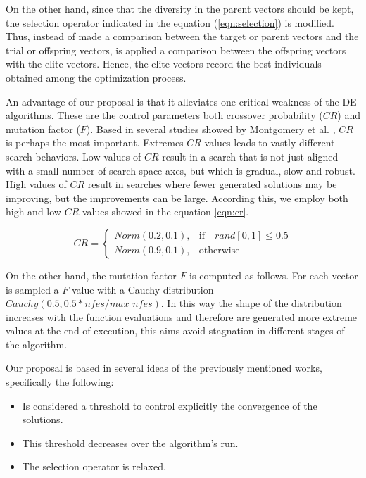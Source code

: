 On the other hand, since that the diversity in the parent vectors should be kept, the selection operator indicated in the equation (\ref{eqn:selection}) is modified.
%
Thus, instead of made a comparison between the target or parent vectors and the trial or offspring vectors, is applied a comparison between the offspring vectors with the elite vectors.
%
Hence, the elite vectors record the best individuals obtained among the optimization process.
%



An advantage of our proposal is that it alleviates one critical weakness of the DE algorithms.
%
These are the control parameters both crossover probability ($CR$) and mutation factor ($F$).
%
Based in several studies showed by Montgomery et al. \cite{montgomery2010analysis}, $CR$ is perhaps the most important.
%
Extremes $CR$ values leads to vastly different search behaviors.
%
Low values of $CR$ result in a search that is not just aligned with a small number of search space axes, but which is gradual, slow and robust.
%
High values of $CR$ result in searches where fewer generated solutions may be improving, but the improvements can be large.
%
According this, we employ both high and low $CR$ values showed in the equation \ref{eqn:cr}.

\begin{equation} \label{eqn:cr}
CR = 
\begin{cases}
     Norm(0.2, 0.1),& \text{if} \quad rand[0,1] \leq 0.5  \\
     Norm(0.9, 0.1),              & \text{otherwise}
\end{cases}
\end{equation}


On the other hand, the mutation factor $F$ is computed as follows.
%
For each vector is sampled a $F$ value with a Cauchy distribution $Cauchy(0.5, 0.5*nfes/max\_nfes)$.
%
In this way the shape of the distribution increases with the function evaluations and therefore are generated more extreme values at the end of execution, this aims avoid stagnation in different stages of the algorithm.
%


Our proposal is based in several ideas of the previously mentioned works, specifically the following:
\begin{itemize}
\item Is considered a threshold to control explicitly the convergence of the solutions.
\item This threshold decreases over the algorithm's run.
\item The selection operator is relaxed. 
\end{itemize}


